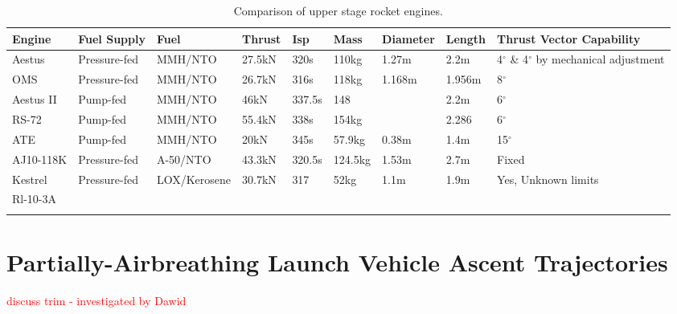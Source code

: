 \begin{landscape}%
\begin{table}

\begin{tabularx}{\linewidth}{|X|X|X|X|X|X|X|X|X|}

	\hline Engine & Fuel Supply & Fuel & Thrust & Isp & Mass & Diameter & Length & Thrust Vector Capability \\ 
	\hline Aestus & Pressure-fed & MMH/NTO & 27.5kN & 320s & 110kg & 1.27m & 2.2m & 4$^\circ$ \& 4$^\circ$ by mechanical adjustment\\ 
	\hline OMS & Pressure-fed  & MMH/NTO & 26.7kN & 316s & 118kg & 1.168m & 1.956m & 8$^\circ$\\ 
	\hline Aestus II & Pump-fed & MMH/NTO & 46kN & 337.5s & 148 &  & 2.2m  & 6$^\circ$\\ 
	\hline RS-72 & Pump-fed & MMH/NTO & 55.4kN & 338s & 154kg &  & 2.286 &  6$^\circ$\\ 
	\hline ATE & Pump-fed & MMH/NTO & 20kN & 345s & 57.9kg & 0.38m & 1.4m &  15$^\circ$\\ 
	\hline AJ10-118K & Pressure-fed & A-50/NTO & 43.3kN & 320.5s & 124.5kg & 1.53m & 2.7m & Fixed \\ 
	\hline Kestrel & Pressure-fed & LOX/Kerosene & 30.7kN & 317 & 52kg & 1.1m & 1.9m  & Yes, Unknown limits\\ 
	\hline Rl-10-3A &  &  &  &  &  &  &   &\\ 
	\hline  &  &  &  &  &  &  &  & \\ 
	\hline 
\end{tabularx} 
\caption {Comparison of upper stage rocket engines.} 
\label{tab:Engine}
\end{table}
\end{landscape}


\section{Partially-Airbreathing Launch Vehicle Ascent Trajectories}
\textcolor{red}{discuss trim - investigated by Dawid}

